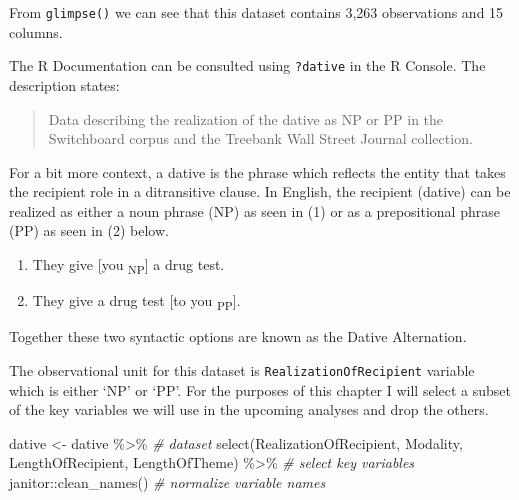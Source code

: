 \documentclass[
]{article}
\newenvironment{Shaded}{\begin{snugshade}}{\end{snugshade}}
\newcommand{\CommentTok}[1]{\textcolor[rgb]{0.56,0.35,0.01}{\textit{#1}}}
\newcommand{\FunctionTok}[1]{\textcolor[rgb]{0.00,0.00,0.00}{#1}}
\newcommand{\NormalTok}[1]{#1}
\newcommand{\OtherTok}[1]{\textcolor[rgb]{0.56,0.35,0.01}{#1}}
\newcommand{\SpecialCharTok}[1]{\textcolor[rgb]{0.00,0.00,0.00}{#1}}
\providecommand{\tightlist}{%
  \setlength{\itemsep}{0pt}\setlength{\parskip}{0pt}}
\begin{document}
From \texttt{glimpse()} we can see that this dataset contains 3,263 observations and 15 columns.

The R Documentation can be consulted using \texttt{?dative} in the R Console. The description states:

\begin{quote}
Data describing the realization of the dative as NP or PP in the Switchboard corpus and the Treebank Wall Street Journal collection.
\end{quote}

For a bit more context, a dative is the phrase which reflects the entity that takes the recipient role in a ditransitive clause. In English, the recipient (dative) can be realized as either a noun phrase (NP) as seen in (1) or as a prepositional phrase (PP) as seen in (2) below.

\begin{enumerate}
\def\labelenumi{\arabic{enumi}.}
\tightlist
\item
  They give {[}you \textsubscript{NP}{]} a drug test.
\item
  They give a drug test {[}to you \textsubscript{PP}{]}.
\end{enumerate}

Together these two syntactic options are known as the Dative Alternation.

The observational unit for this dataset is \texttt{RealizationOfRecipient} variable which is either `NP' or `PP'. For the purposes of this chapter I will select a subset of the key variables we will use in the upcoming analyses and drop the others.

\begin{Shaded}
\begin{Highlighting}[]
\NormalTok{dative }\OtherTok{\textless{}{-}} 
\NormalTok{  dative }\SpecialCharTok{\%\textgreater{}\%} \CommentTok{\# dataset}
  \FunctionTok{select}\NormalTok{(RealizationOfRecipient, Modality, LengthOfRecipient, LengthOfTheme) }\SpecialCharTok{\%\textgreater{}\%} \CommentTok{\# select key variables}
\NormalTok{  janitor}\SpecialCharTok{::}\FunctionTok{clean\_names}\NormalTok{() }\CommentTok{\# normalize variable names}
\end{Highlighting}
\end{Shaded}
\end{document}

